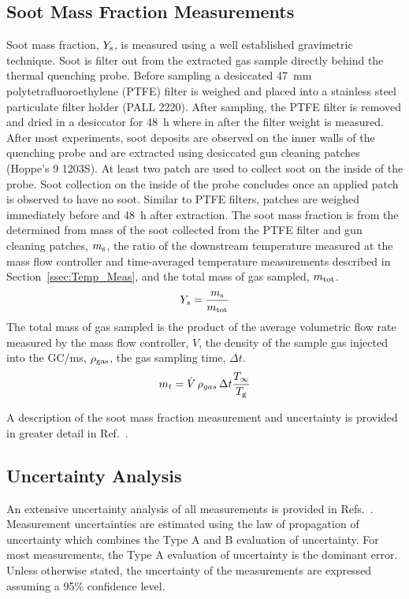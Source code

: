 \documentclass[12pt]{ussci}
\begin{document}
\subsection{Soot Mass Fraction Measurements}
Soot mass fraction, $Y_{\rm s}$, is measured using a well established gravimetric technique. Soot is filter out from the extracted gas sample directly behind the thermal quenching probe. Before sampling a desiccated 47~mm polytetrafluoroethylene (PTFE) filter is weighed and placed into a stainless steel particulate filter holder (PALL 2220). After sampling, the PTFE filter is removed and dried in a desiccator for 48~h where in after the filter weight is measured. 
After most experiments, soot deposits are observed on the inner walls of the quenching probe and are extracted using desiccated gun cleaning patches (Hoppe's 9 1203S). At least two patch are used to collect soot on the inside of the probe. Soot collection on the inside of the probe concludes once an applied patch is observed to have no soot. Similar to PTFE filters, patches are weighed immediately before and 48~h after extraction. 
The soot mass fraction is  from the determined from mass of the soot collected from the PTFE filter and gun cleaning patches, $m_{\rm s}$, the ratio of the downstream temperature measured at the mass flow controller and time-averaged temperature measurements described in Section~\ref{ssec:Temp_Meas}, and the total mass of gas sampled, $m_{\rm tot}$.
\begin{equation}\label{eq:soot_mass_frac}
Y_{s}= \frac{m_{\rm s}}{m_{\rm tot}}
\end{equation}
The total mass of gas sampled is the product of the average volumetric flow rate measured by the mass flow controller, $\dot{V}$, the density of the sample gas injected into the GC/ms, $\rho_{\rm gas}$, the gas sampling time, $\Delta t$. 
\begin{equation}\label{eq:total_mass}
m_{t}= \dot{V} \, \rho_{gas}\, \Delta t \frac{T_{\infty}}{T_{\rm g}}
\end{equation}

A description of the soot mass fraction measurement and uncertainty is provided in greater detail in Ref.~\cite{ Falkenstein2021a}. 

\subsection{Uncertainty Analysis}
An extensive uncertainty analysis of all measurements is provided in Refs.~\cite{Sung2020,Sung2021, Falkenstein2021a}. Measurement uncertainties are estimated using the law of propagation of uncertainty which combines the Type A and B evaluation of uncertainty. For most measurements, the Type A evaluation of uncertainty is the dominant error. Unless otherwise stated, the uncertainty of the measurements are expressed assuming a 95\% confidence level. 
\end{document}
